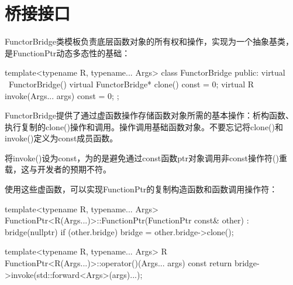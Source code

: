 \section{桥接接口}
FunctorBridge类模板负责底层函数对象的所有权和操作，实现为一个抽象基类，是FunctionPtr动态多态性的基础：

\begin{cpp}
template<typename R, typename... Args>
class FunctorBridge
{
	public:
	virtual ~FunctorBridge() {
	}
	virtual FunctorBridge* clone() const = 0;
	virtual R invoke(Args... args) const = 0;
};
\end{cpp}

FunctorBridge提供了通过虚函数操作存储函数对象所需的基本操作：析构函数、执行复制的clone()操作和调用。操作调用基础函数对象。不要忘记将clone()和invoke()定义为const成员函数。

\begin{notice}
将invoke()设为const，为的是避免通过const函数ptr对象调用非const操作符()重载，这与开发者的预期不符。
\end{notice}

使用这些虚函数，可以实现FunctionPtr的复制构造函数和函数调用操作符：

\begin{cpp}
template<typename R, typename... Args>
FunctionPtr<R(Args...)>::FunctionPtr(FunctionPtr const& other)
: bridge(nullptr)
{
	if (other.bridge) {
		bridge = other.bridge->clone();
	}
}

template<typename R, typename... Args>
R FunctionPtr<R(Args...)>::operator()(Args... args) const
{
	return bridge->invoke(std::forward<Args>(args)...);
}
\end{cpp}














































